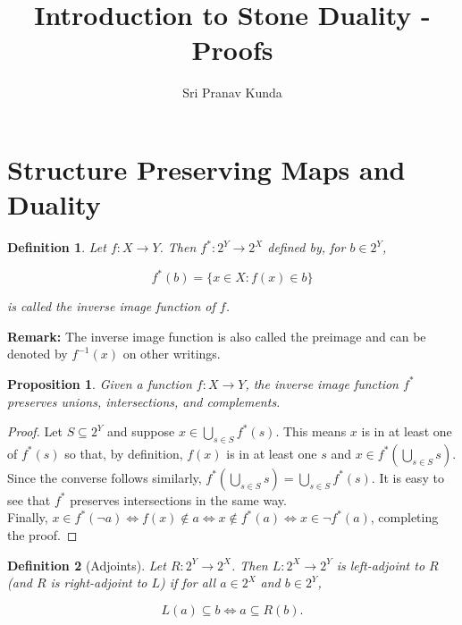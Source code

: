 \documentclass{article}
\title{Introduction to Stone Duality - Proofs}
\author{Sri Pranav Kunda}
\date{}
\newtheorem{proposition}{Proposition}
\newtheorem{definition}{Definition}
\begin{document}
\maketitle


\section{Structure Preserving Maps and Duality}

\begin{definition}
Let $f : X \to Y$. Then $f^* : 2^Y \to 2^X$ defined by, for $b \in 2^Y$,

$$f^*(b) = \{x \in X: f(x) \in b\}$$

is called the inverse image function of $f$.
\end{definition}

\textbf{Remark: } The inverse image function is also called the preimage and can be denoted by $f^{-1}(x)$ on other writings. 

\begin{proposition}
Given a function $f : X \to Y$, the inverse image function $f^*$ preserves unions, intersections, and complements. 
\end{proposition}

\begin{proof}
Let $S \subseteq 2^Y$ and suppose $x \in \bigcup_{s \in S} f^*(s)$. This means $x$ is in at least one of $f^*(s)$ so that, by definition, $f(x)$ is in at least one $s$ and $x \in f^*(\bigcup_{s \in S} s)$. \\

Since the converse follows similarly, $f^*(\bigcup_{s \in S} s) = \bigcup_{s \in S} f^*(s)$. It is easy to see that $f^*$ preserves intersections in the same way. \\

Finally, $x \in f^*(\neg a) \Longleftrightarrow f(x) \not\in a \Longleftrightarrow x \not\in f^*(a) \Longleftrightarrow x \in \neg f^*(a)$, completing the proof.
\end{proof}

\begin{definition}[Adjoints]
Let $R : 2^Y \to 2^X$. Then $L : 2^X \to 2^Y$ is left-adjoint to $R$ (and $R$ is right-adjoint to $L$) if for all $a \in 2^X$ and $b \in 2^Y$,

\begin{equation} \label{eq:ajdoints}
L(a) \subseteq b \Longleftrightarrow a \subseteq R(b).
\end{equation}
\end{definition}
\end{document}
